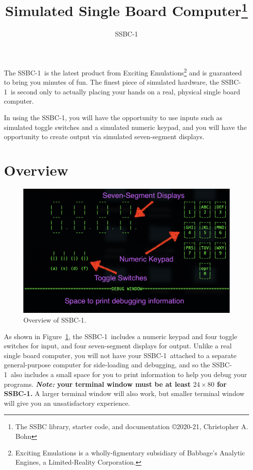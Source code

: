 \documentclass[12pt]{article}
\newcommand{\SSBC}{SSBC-1}
\begin{document}
\title{Simulated Single Board Computer\footnote{The SSBC library, starter code, and documentation \copyright 2020-21, Christopher A. Bohn}}
\author{\SSBC}
\date{}
\maketitle

The \SSBC\ is the latest product from Exciting Emulations\footnote{Exciting
Emulations is a wholly-figmentary subsidiary of Babbage's Analytic Engines, a
Limited-Reality Corporation.} and is guaranteed to bring you minutes of fun.
The finest piece of simulated hardware, the \SSBC\ is second only to actually
placing your hands on a real, physical single board computer.

In using the \SSBC, you will have the opportunity to use inputs such as
simulated toggle switches and a simulated numeric keypad, and you will have the
opportunity to create output via simulated seven-segment displays.

\section{Overview}

\begin{figure}
    \centering
    \includegraphics[width=15cm]{overview}
    \caption{Overview of \SSBC.\label{fig:overview}}
\end{figure}

As shown in Figure~\ref{fig:overview}, the \SSBC\ includes a numeric keypad and
four toggle switches for input, and four seven-segment displays for output.
Unlike a real single board computer, you will not have your \SSBC\ attached to a
separate general-purpose computer for side-loading and debugging, and so the
\SSBC\ also includes a small space for you to print information to help you
debug your programs. \textbf{\textit{Note:} your terminal window must be at
least $24 \times 80$ for \SSBC.} A larger terminal window will also work, but
smaller terminal window will give you an unsatisfactory experience.
\end{document}
